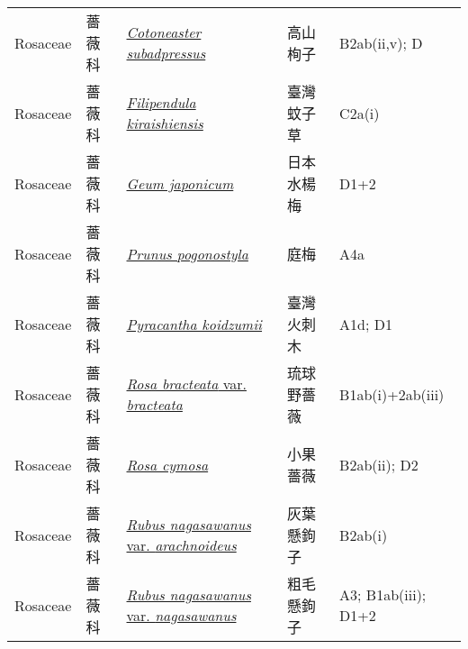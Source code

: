 {\begin{longtable}{p{2.5cm}p{2cm}p{5cm}p{2.5cm}p{3cm}}
    Rosaceae & 薔薇科 & \href{http://www.theplantlist.org/tpl1.1/search?q=Cotoneaster+subadpressus}{\textit{Cotoneaster subadpressus} } & 高山栒子 & B2ab(ii,v); D \index{Cotoneaster@\textit{Cotoneaster}!subadpressus@\textit{subadpressus}}  \index{高山栒子} \\
    Rosaceae & 薔薇科 & \href{http://www.theplantlist.org/tpl1.1/search?q=Filipendula+kiraishiensis}{\textit{Filipendula kiraishiensis} } & 臺灣蚊子草 & C2a(i) \index{Filipendula@\textit{Filipendula}!kiraishiensis@\textit{kiraishiensis}}  \index{臺灣蚊子草} \\
    Rosaceae & 薔薇科 & \href{http://www.theplantlist.org/tpl1.1/search?q=Geum+japonicum}{\textit{Geum japonicum} } & 日本水楊梅 & D1+2 \index{Geum@\textit{Geum}!japonicum@\textit{japonicum}}  \index{日本水楊梅} \\
    Rosaceae & 薔薇科 & \href{http://www.theplantlist.org/tpl1.1/search?q=Prunus+pogonostyla}{\textit{Prunus pogonostyla} } & 庭梅 & A4a \index{Prunus@\textit{Prunus}!pogonostyla@\textit{pogonostyla}}  \index{庭梅} \\
    Rosaceae & 薔薇科 & \href{http://www.theplantlist.org/tpl1.1/search?q=Pyracantha+koidzumii}{\textit{Pyracantha koidzumii} } & 臺灣火刺木 & A1d; D1 \index{Pyracantha@\textit{Pyracantha}!koidzumii@\textit{koidzumii}}  \index{臺灣火刺木} \\
    Rosaceae & 薔薇科 & \href{http://www.theplantlist.org/tpl1.1/search?q=Rosa+bracteata+var.+bracteata}{\textit{Rosa bracteata} var. \textit{bracteata} } & 琉球野薔薇 & B1ab(i)+2ab(iii) \index{Rosa@\textit{Rosa}!bracteata@\textit{bracteata}!var. bracteata@var. \textit{bracteata}}  \index{琉球野薔薇} \\
    Rosaceae & 薔薇科 & \href{http://www.theplantlist.org/tpl1.1/search?q=Rosa+cymosa}{\textit{Rosa cymosa} } & 小果薔薇 & B2ab(ii); D2 \index{Rosa@\textit{Rosa}!cymosa@\textit{cymosa}}  \index{小果薔薇} \\
    Rosaceae & 薔薇科 & \href{http://www.theplantlist.org/tpl1.1/search?q=Rubus+nagasawanus+var.+arachnoideus}{\textit{Rubus nagasawanus} var. \textit{arachnoideus} } & 灰葉懸鉤子 & B2ab(i) \index{Rubus@\textit{Rubus}!nagasawanus@\textit{nagasawanus}!var. arachnoideus@var. \textit{arachnoideus}}  \index{灰葉懸鉤子} \\
    Rosaceae & 薔薇科 & \href{http://www.theplantlist.org/tpl1.1/search?q=Rubus+nagasawanus+var.+nagasawanus}{\textit{Rubus nagasawanus} var. \textit{nagasawanus} } & 粗毛懸鉤子 & A3; B1ab(iii); D1+2 \index{Rubus@\textit{Rubus}!nagasawanus@\textit{nagasawanus}!var. nagasawanus@var. \textit{nagasawanus}}  \index{粗毛懸鉤子} \\

\end{longtable}}
